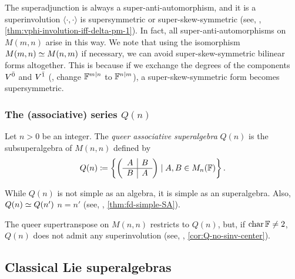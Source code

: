 The superadjunction is always a super-anti-automorphism, and it is a superinvolution \IFF $\langle \cdot, \cdot \rangle$ is supersymmetric or super-skew-symmetric (see, \eg, \cref{thm:vphi-involution-iff-delta-pm-1}). 
In fact, all super-anti-automorphisms on $M(m,n)$ arise in this way. 
We note that using the isomorphism $M(m,n) \simeq M(n,m)$ if necessary, we can avoid super-skew-symmetric bilinear forms altogether. 
This is because if we exchange the degrees of the components $V^{\bar0}$ and $V^{\bar1}$ (\ie, change $\mathbb{F}^{m|n}$ to $\mathbb{F}^{n|m}$), a super-skew-symmetric form becomes supersymmetric. 

\subsubsection{The (associative) series \texorpdfstring{$Q(n)$}{Q(n)}}

Let $n > 0$ be an integer. 
The \emph{queer associative superalgebra} $Q(n)$ is the subsuperalgebra of $M(n,n)$ defined by
\[
    Q(n) \coloneqq \left\{ \left(\begin{array}{c|c}
        A & B\\
        \hline
        B & A
    \end{array}\right)
    \mid A,B\in M_{n}(\mathbb{F})
    \right\}.
\]

While $Q(n)$ is not simple as an algebra, it is simple as an superalgebra. 
Also, $Q(n) \simeq Q(n')$ \IFF $n=n'$ (see, \eg, \cref{thm:fd-simple-SA}). 

The queer supertranspose on $M(n,n)$ restricts to $Q(n)$, but, if $\operatorname{char} \mathbb{F} \neq 2$,
$Q(n)$ does not admit any superinvolution (see, \eg, \cref{cor:Q-no-sinv-center}). 



\subsection{Classical Lie superalgebras}\label{sec:defi-classical-SA}

